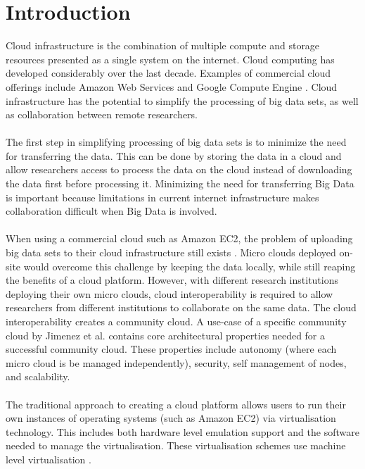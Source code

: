 \documentclass{sig-alternate-05-2015}
\begin{document}
\section{Introduction}
Cloud infrastructure is the combination of multiple compute and storage resources presented as a single system on the internet. Cloud computing has developed considerably over the last decade. Examples of commercial cloud offerings include Amazon Web Services and Google Compute Engine \cite{krishnan2015google, mathew2014overview}. Cloud infrastructure has the potential to simplify the processing of big data sets, as well as collaboration between remote researchers. 
\\
\\
The first step in simplifying processing of big data sets is to minimize the need for transferring the data. This can be done by storing the data in a cloud and allow researchers access to process the data on the cloud instead of downloading the data first before processing it. Minimizing the need for transferring Big Data is important because limitations in current internet infrastructure makes collaboration difficult when Big Data is involved. 
\\
\\
When using a commercial cloud such as Amazon EC2, the problem of uploading big data sets to their cloud infrastructure still exists \cite{baker2010next}. Micro clouds deployed on-site would overcome this challenge by keeping the data locally, while still reaping the benefits of a cloud platform. However, with different research institutions deploying their own micro clouds, cloud interoperability is required to allow researchers from different institutions to collaborate on the same data. The cloud interoperability creates a community cloud. A use-case of a specific community cloud  by Jimenez et al. \cite{jimenez2014deploying} contains core architectural properties needed for a successful community cloud. These properties include autonomy (where each micro cloud is be managed independently), security, self management of nodes, and scalability.
\\
\\
The traditional approach to creating a cloud platform allows users to run their own instances of operating systems (such as Amazon EC2) via virtualisation technology. This includes both hardware level emulation support and the software needed to manage the virtualisation. These virtualisation schemes use machine level virtualisation \cite{fink2014docker}. \\\\
\end{document}
